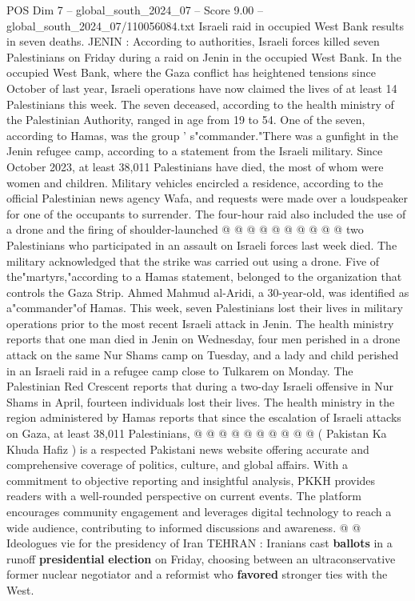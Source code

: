\begin{textsample}{POS Dim 7 – global\_south\_2024\_07 – Score 9.00 – global\_south\_2024\_07/110056084.txt}  \label{ex:f7_pos_108}
Israeli raid in occupied West Bank results in seven deaths.
JENIN : According to authorities, Israeli forces killed seven Palestinians on Friday during a raid on Jenin in the occupied West Bank.
In the occupied West Bank, where the Gaza conflict has heightened tensions since October of last year, Israeli operations have now claimed the lives of at least 14 Palestinians this week.
The seven deceased, according to the health ministry of the Palestinian Authority, ranged in age from 19 to 54.
One of the seven, according to Hamas, was the group ' s"commander."There was a gunfight in the Jenin refugee camp, according to a statement from the Israeli military.
Since October 2023, at least 38,011 Palestinians have died, the most of whom were women and children.
Military vehicles encircled a residence, according to the official Palestinian news agency Wafa, and requests were made over a loudspeaker for one of the occupants to surrender.
The four-hour raid also included the use of a drone and the firing of shoulder-launched @ @ @ @ @ @ @ @ @ @ two Palestinians who participated in an assault on Israeli forces last week died.
The military acknowledged that the strike was carried out using a drone.
Five of the"martyrs,"according to a Hamas statement, belonged to the organization that controls the Gaza Strip.
Ahmed Mahmud al-Aridi, a 30-year-old, was identified as a"commander"of Hamas.
This week, seven Palestinians lost their lives in military operations prior to the most recent Israeli attack in Jenin.
The health ministry reports that one man died in Jenin on Wednesday, four men perished in a drone attack on the same Nur Shams camp on Tuesday, and a lady and child perished in an Israeli raid in a refugee camp close to Tulkarem on Monday.
The Palestinian Red Crescent reports that during a two-day Israeli offensive in Nur Shams in April, fourteen individuals lost their lives.
The health ministry in the region administered by Hamas reports that since the escalation of Israeli attacks on Gaza, at least 38,011 Palestinians, @ @ @ @ @ @ @ @ @ @ ( Pakistan Ka Khuda Hafiz ) is a respected Pakistani news website offering accurate and comprehensive coverage of politics, culture, and global affairs.
With a commitment to objective reporting and insightful analysis, PKKH provides readers with a well-rounded perspective on current events.
The platform encourages community engagement and leverages digital technology to reach a wide audience, contributing to informed discussions and awareness. @ @ Ideologues vie for the presidency of Iran TEHRAN : Iranians cast \textbf{ballots} in a runoff \textbf{presidential} \textbf{election} on Friday, choosing between an ultraconservative former nuclear negotiator and a reformist who \textbf{favored} stronger ties with the West.

\end{textsample}
